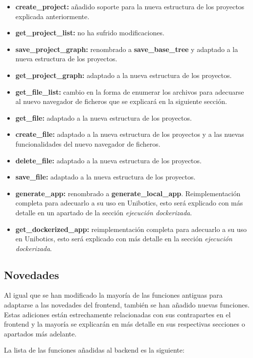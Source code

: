 \begin{itemize}
    \item \textbf{create\_project:} añadido soporte para la nueva estructura de los proyectos explicada anteriormente.
    \item \textbf{get\_project\_list:} no ha sufrido modificaciones.
    \item \textbf{save\_project\_graph:} renombrado a \textbf{save\_base\_tree} y adaptado a la nueva estructura de los proyectos. 
    \item \textbf{get\_project\_graph:} adaptado a la nueva estructura de los proyectos.
    \item \textbf{get\_file\_list:} cambio en la forma de enumerar los archivos para adecuarse al nuevo navegador de ficheros que se explicará en la siguiente sección. 
    \item \textbf{get\_file:} adaptado a la nueva estructura de los proyectos.
    \item \textbf{create\_file:} adaptado a la nueva estructura de los proyectos y a las nuevas funcionalidades del nuevo navegador de ficheros.
    \item \textbf{delete\_file:} adaptado a la nueva estructura de los proyectos.
    \item \textbf{save\_file:} adaptado a la nueva estructura de los proyectos.
    \item \textbf{generate\_app:} renombrado a \textbf{generate\_local\_app}. Reimplementación completa para adecuarlo a su uso en Unibotics, esto será explicado con más detalle en un apartado de la sección \textit{ejecución dockerizada}.
    \item \textbf{get\_dockerized\_app:} reimplementación completa para adecuarlo a su uso en Unibotics, esto será explicado con más detalle en la sección \textit{ejecución dockerizada}.
\end{itemize}

\subsection{Novedades}

Al igual que se han modificado la mayoría de las funciones antiguas para adaptarse a las novedades del frontend, también se han añadido nuevas funciones. Estas adiciones están estrechamente relacionadas con sus contrapartes en el frontend y la mayoría se explicarán en más detalle en sus respectivas secciones o apartados más adelante.

La lista de las funciones añadidas al backend es la siguiente:

